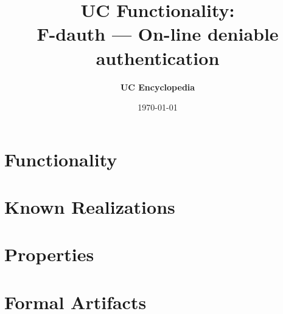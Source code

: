 \documentclass[11pt,a4paper]{article}
\title{\textbf{\Large UC Functionality:}\\[0.2em] \Large F-dauth --- On-line deniable authentication}
\author{\textbf{UC Encyclopedia}}
\date{\today}
\newtheorem{functionality}{Functionality}
\begin{document}
\maketitle

\begin{abstract}
\end{abstract}

\section{Functionality}

%

\section{Known Realizations}


\section{Properties}


\section{Formal Artifacts}

\end{document}
